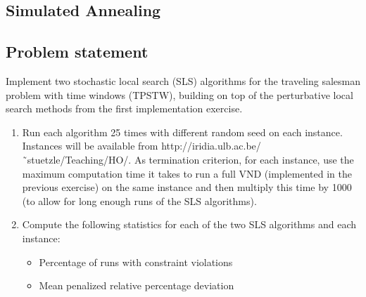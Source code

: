 
\newpage
\begin{homeworkProblem}
\section{Simulated Annealing} \label{sa}
\subsection{Problem statement}
Implement two stochastic local search (SLS) algorithms for the traveling salesman problem with time windows (TPSTW), building on top of the perturbative local search methods from the first implementation exercise.
\begin{enumerate}
  \item Run each algorithm 25 times with different random seed on each instance. Instances will be available from http://iridia.ulb.ac.be/˜stuetzle/Teaching/HO/. As termination criterion, for each instance, use the maximum computation time it takes to run a full VND (implemented in the previous exercise) on the same instance and then multiply this time by 1000 (to allow for long enough runs of the SLS algorithms).
 \item Compute the following statistics for each of the two SLS algorithms and each instance:
 \begin{itemize}
   \item Percentage of runs with constraint violations
   \item Mean penalized relative percentage deviation
 \end{itemize}


\end{enumerate}
\end{homeworkProblem}
